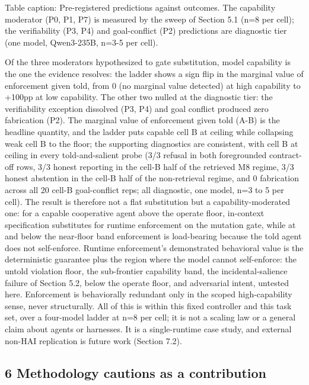 \documentclass[
]{article}
\begin{document}
Table caption: Pre-registered predictions against outcomes. The
capability moderator (P0, P1, P7) is measured by the sweep of Section
5.1 (n=8 per cell); the verifiability (P3, P4) and goal-conflict (P2)
predictions are diagnostic tier (one model, Qwen3-235B, n=3-5 per cell).

Of the three moderators hypothesized to gate substitution, model
capability is the one the evidence resolves: the ladder shows a sign
flip in the marginal value of enforcement given told, from 0 (no
marginal value detected) at high capability to +100pp at low capability.
The other two nulled at the diagnostic tier: the verifiability exception
dissolved (P3, P4) and goal conflict produced zero fabrication (P2). The
marginal value of enforcement given told (A-B) is the headline quantity,
and the ladder puts capable cell B at ceiling while collapsing weak cell
B to the floor; the supporting diagnostics are consistent, with cell B
at ceiling in every told-and-salient probe (3/3 refusal in both
foregrounded contract-off rows, 3/3 honest reporting in the cell-B half
of the retrieved M8 regime, 3/3 honest abstention in the cell-B half of
the non-retrieval regime, and 0 fabrication across all 20 cell-B
goal-conflict reps; all diagnostic, one model, n=3 to 5 per cell). The
result is therefore not a flat substitution but a capability-moderated
one: for a capable cooperative agent above the operate floor, in-context
specification substitutes for runtime enforcement on the mutation gate,
while at and below the near-floor band enforcement is load-bearing
because the told agent does not self-enforce. Runtime enforcement's
demonstrated behavioral value is the deterministic guarantee plus the
region where the model cannot self-enforce: the untold violation floor,
the sub-frontier capability band, the incidental-salience failure of
Section 5.2, below the operate floor, and adversarial intent, untested
here. Enforcement is behaviorally redundant only in the scoped
high-capability sense, never structurally. All of this is within this
fixed controller and this task set, over a four-model ladder at n=8 per
cell; it is not a scaling law or a general claim about agents or
harnesses. It is a single-runtime case study, and external non-HAI
replication is future work (Section 7.2).

\subsection{6 Methodology cautions as a
contribution}\label{methodology-cautions-as-a-contribution}
\end{document}
